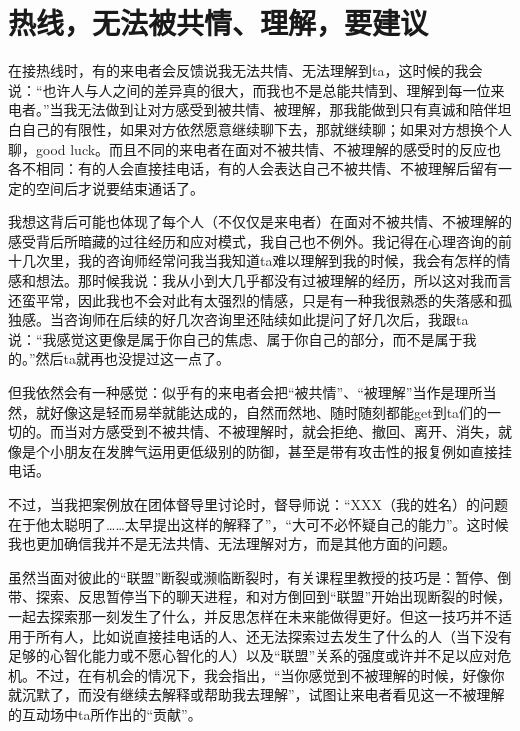 \chapter{热线，无法被共情、理解，要建议}





在接热线时，有的来电者会反馈说我无法共情、无法理解到ta，这时候的我会说：“也许人与人之间的差异真的很大，而我也不是总能共情到、理解到每一位来电者。”当我无法做到让对方感受到被共情、被理解，那我能做到只有真诚和陪伴\pozhehao{}坦白自己的有限性，如果对方依然愿意继续聊下去，那就继续聊；如果对方想换个人聊，good luck。而且不同的来电者在面对不被共情、不被理解的感受时的反应也各不相同：有的人会直接挂电话，有的人会表达自己不被共情、不被理解后留有一定的空间后才说要结束通话了。

我想这背后可能也体现了每个人（不仅仅是来电者）在面对不被共情、不被理解的感受背后所暗藏的过往经历和应对模式，我自己也不例外。我记得在心理咨询的前十几次里，我的咨询师经常问我当我知道ta难以理解到我的时候，我会有怎样的情感和想法。那时候我说：我从小到大几乎都没有过被理解的经历，所以这对我而言还蛮平常，因此我也不会对此有太强烈的情感，只是有一种我很熟悉的失落感和孤独感。当咨询师在后续的好几次咨询里还陆续如此提问了好几次后，我跟ta说：“我感觉这更像是属于你自己的焦虑、属于你自己的部分，而不是属于我的。”然后ta就再也没提过这一点了。

但我依然会有一种感觉：似乎有的来电者会把“被共情”、“被理解”当作是理所当然，就好像这是轻而易举就能达成的，自然而然地、随时随刻都能get到ta们的一切的。而当对方感受到不被共情、不被理解时，就会拒绝、撤回、离开、消失，就像是个小朋友在发脾气\pozhehao{}运用更低级别的防御，甚至是带有攻击性的报复\pozhehao{}例如直接挂电话。

不过，当我把案例放在团体督导里讨论时，督导师说：“XXX（我的姓名）的问题在于他太聪明了……太早提出这样的解释了”，“大可不必怀疑自己的能力”。这时候我也更加确信我并不是无法共情、无法理解对方，而是其他方面的问题。

虽然当面对彼此的“联盟”断裂或濒临断裂时，有关课程里教授的技巧是：暂停、倒带、探索、反思\pozhehao{}暂停当下的聊天进程，和对方倒回到“联盟”开始出现断裂的时候，一起去探索那一刻发生了什么，并反思怎样在未来能做得更好。但这一技巧并不适用于所有人，比如说直接挂电话的人、还无法探索过去发生了什么的人（当下没有足够的心智化能力或不愿心智化的人）以及“联盟”关系的强度或许并不足以应对危机。不过，在有机会的情况下，我会指出，“当你感觉到不被理解的时候，好像你就沉默了，而没有继续去解释或帮助我去理解”，试图让来电者看见这一不被理解的互动场中ta所作出的“贡献”。

